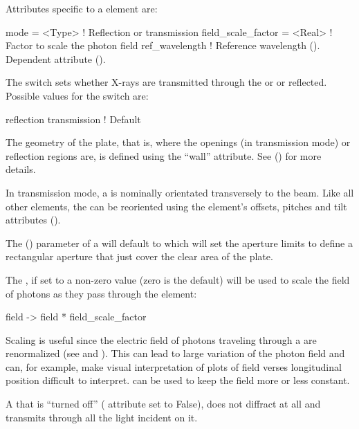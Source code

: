 Attributes specific to a  element are:
\begin{example}
  mode               = <Type>   ! Reflection or transmission
  field_scale_factor = <Real>   ! Factor to scale the photon field
  ref_wavelength                ! Reference wavelength (). Dependent attribute ().
\end{example}

The  switch sets whether X-rays are transmitted through the
 or or reflected. Possible values for the
 switch are:
\begin{example}
  reflection
  transmission        ! Default
\end{example}

The geometry of the plate, that is, where the openings (in
transmission mode) or reflection regions are, is defined using the
``wall'' attribute. See () for more details.

In transmission mode, a  is nominally orientated
transversely to the beam. Like all other elements, the
 can be reoriented using the element's offsets,
pitches and tilt attributes ().

The  () parameter of a
 will default to  which will set the
aperture limits to define a rectangular aperture that just cover the
clear area of the plate.

The , if set to a non-zero value (zero is the
default) will be used to scale the field of photons as they pass through
the  element:
\begin{example}
  field -> field * field_scale_factor
\end{example}
Scaling is useful since the electric field of photons traveling through a
 are renormalized (see  and
). This can lead to large variation of the photon field and
can, for example, make visual interpretation of plots of field verses
longitudinal position difficult to interpret. 
can be used to keep the field more or less constant.

A  that is ``turned off'' ( attribute
set to False), does not diffract at all and transmits through all
the light incident on it.


